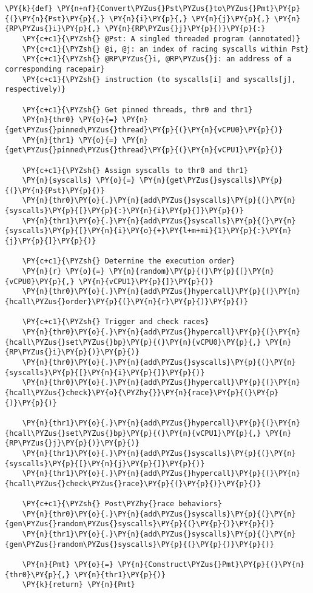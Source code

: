 \begin{Verbatim}[commandchars=\\\{\},codes={\catcode`\$=3\catcode`\^=7\catcode`\_=8\relax}]
\PY{k}{def} \PY{n+nf}{Convert\PYZus{}Pst\PYZus{}to\PYZus{}Pmt}\PY{p}{(}\PY{n}{Pst}\PY{p}{,} \PY{n}{i}\PY{p}{,} \PY{n}{j}\PY{p}{,} \PY{n}{RP\PYZus{}i}\PY{p}{,} \PY{n}{RP\PYZus{}j}\PY{p}{)}\PY{p}{:}
    \PY{c+c1}{\PYZsh{} @Pst: A singled threaded program (annotated)}
    \PY{c+c1}{\PYZsh{} @i, @j: an index of racing syscalls within Pst}
    \PY{c+c1}{\PYZsh{} @RP\PYZus{}i, @RP\PYZus{}j: an address of a corresponding racepair}
    \PY{c+c1}{\PYZsh{} instruction (to syscalls[i] and syscalls[j], respectively)}

    \PY{c+c1}{\PYZsh{} Get pinned threads, thr0 and thr1}
    \PY{n}{thr0} \PY{o}{=} \PY{n}{get\PYZus{}pinned\PYZus{}thread}\PY{p}{(}\PY{n}{vCPU0}\PY{p}{)}
    \PY{n}{thr1} \PY{o}{=} \PY{n}{get\PYZus{}pinned\PYZus{}thread}\PY{p}{(}\PY{n}{vCPU1}\PY{p}{)}

    \PY{c+c1}{\PYZsh{} Assign syscalls to thr0 and thr1}
    \PY{n}{syscalls} \PY{o}{=} \PY{n}{get\PYZus{}syscalls}\PY{p}{(}\PY{n}{Pst}\PY{p}{)}
    \PY{n}{thr0}\PY{o}{.}\PY{n}{add\PYZus{}syscalls}\PY{p}{(}\PY{n}{syscalls}\PY{p}{[}\PY{p}{:}\PY{n}{i}\PY{p}{]}\PY{p}{)}
    \PY{n}{thr1}\PY{o}{.}\PY{n}{add\PYZus{}syscalls}\PY{p}{(}\PY{n}{syscalls}\PY{p}{[}\PY{n}{i}\PY{o}{+}\PY{l+m+mi}{1}\PY{p}{:}\PY{n}{j}\PY{p}{]}\PY{p}{)}

    \PY{c+c1}{\PYZsh{} Determine the execution order}
    \PY{n}{r} \PY{o}{=} \PY{n}{random}\PY{p}{(}\PY{p}{[}\PY{n}{vCPU0}\PY{p}{,} \PY{n}{vCPU1}\PY{p}{]}\PY{p}{)}
    \PY{n}{thr0}\PY{o}{.}\PY{n}{add\PYZus{}hypercall}\PY{p}{(}\PY{n}{hcall\PYZus{}order}\PY{p}{(}\PY{n}{r}\PY{p}{)}\PY{p}{)}

    \PY{c+c1}{\PYZsh{} Trigger and check races}
    \PY{n}{thr0}\PY{o}{.}\PY{n}{add\PYZus{}hypercall}\PY{p}{(}\PY{n}{hcall\PYZus{}set\PYZus{}bp}\PY{p}{(}\PY{n}{vCPU0}\PY{p}{,} \PY{n}{RP\PYZus{}i}\PY{p}{)}\PY{p}{)}
    \PY{n}{thr0}\PY{o}{.}\PY{n}{add\PYZus{}syscalls}\PY{p}{(}\PY{n}{syscalls}\PY{p}{[}\PY{n}{i}\PY{p}{]}\PY{p}{)}
    \PY{n}{thr0}\PY{o}{.}\PY{n}{add\PYZus{}hypercall}\PY{p}{(}\PY{n}{hcall\PYZus{}check}\PY{o}{\PYZhy{}}\PY{n}{race}\PY{p}{(}\PY{p}{)}\PY{p}{)}

    \PY{n}{thr1}\PY{o}{.}\PY{n}{add\PYZus{}hypercall}\PY{p}{(}\PY{n}{hcall\PYZus{}set\PYZus{}bp}\PY{p}{(}\PY{n}{vCPU1}\PY{p}{,} \PY{n}{RP\PYZus{}j}\PY{p}{)}\PY{p}{)}
    \PY{n}{thr1}\PY{o}{.}\PY{n}{add\PYZus{}syscalls}\PY{p}{(}\PY{n}{syscalls}\PY{p}{[}\PY{n}{j}\PY{p}{]}\PY{p}{)}
    \PY{n}{thr1}\PY{o}{.}\PY{n}{add\PYZus{}hypercall}\PY{p}{(}\PY{n}{hcall\PYZus{}check\PYZus{}race}\PY{p}{(}\PY{p}{)}\PY{p}{)}

    \PY{c+c1}{\PYZsh{} Post\PYZhy{}race behaviors}
    \PY{n}{thr0}\PY{o}{.}\PY{n}{add\PYZus{}syscalls}\PY{p}{(}\PY{n}{gen\PYZus{}random\PYZus{}syscalls}\PY{p}{(}\PY{p}{)}\PY{p}{)}
    \PY{n}{thr1}\PY{o}{.}\PY{n}{add\PYZus{}syscalls}\PY{p}{(}\PY{n}{gen\PYZus{}random\PYZus{}syscalls}\PY{p}{(}\PY{p}{)}\PY{p}{)}

    \PY{n}{Pmt} \PY{o}{=} \PY{n}{Construct\PYZus{}Pmt}\PY{p}{(}\PY{n}{thr0}\PY{p}{,} \PY{n}{thr1}\PY{p}{)}
    \PY{k}{return} \PY{n}{Pmt}
\end{Verbatim}
